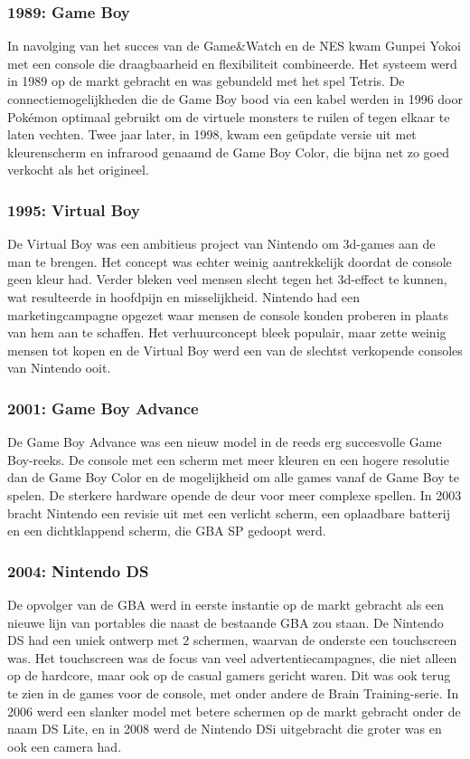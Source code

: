 \documentclass{article}
\begin{document}
\subsubsection{1989: Game Boy}
In navolging van het succes van de Game\&Watch en de NES kwam Gunpei Yokoi met een console die draagbaarheid en flexibiliteit combineerde. Het systeem werd in 1989 op de markt gebracht en was gebundeld met het spel Tetris. De connectiemogelijkheden die de Game Boy bood via een kabel werden in 1996 door Pok\'emon optimaal gebruikt om de virtuele monsters te ruilen of tegen elkaar te laten vechten. Twee jaar later, in 1998, kwam een ge\"update versie uit met kleurenscherm en infrarood genaamd de Game Boy Color, die bijna net zo goed verkocht als het origineel.
\subsubsection{1995: Virtual Boy}
De Virtual Boy was een ambitieus project van Nintendo om 3d-games aan de man te brengen. Het concept was echter weinig aantrekkelijk doordat de console geen kleur had. Verder bleken veel mensen slecht tegen het 3d-effect te kunnen, wat resulteerde in hoofdpijn en misselijkheid. Nintendo had een marketingcampagne opgezet waar mensen de console konden proberen in plaats van hem aan te schaffen. Het verhuurconcept bleek populair, maar zette weinig mensen tot kopen en de Virtual Boy werd een van de slechtst verkopende consoles van Nintendo ooit. 
\subsubsection{2001: Game Boy Advance}
De Game Boy Advance was een nieuw model in de reeds erg succesvolle Game Boy-reeks. De console met een scherm met meer kleuren en een hogere resolutie dan de Game Boy Color en de mogelijkheid om alle games vanaf de Game Boy te spelen. De sterkere hardware opende de deur voor meer complexe spellen. In 2003 bracht Nintendo een revisie uit met een verlicht scherm, een oplaadbare batterij en een dichtklappend scherm, die GBA SP gedoopt werd.
\subsubsection{2004: Nintendo DS}
De opvolger van de GBA werd in eerste instantie op de markt gebracht als een nieuwe lijn van portables die naast de bestaande GBA zou staan. De Nintendo DS had een uniek ontwerp met 2 schermen, waarvan de onderste een touchscreen was. Het touchscreen was de focus van veel advertentiecampagnes, die niet alleen op de hardcore, maar ook op de casual gamers gericht waren. Dit was ook terug te zien in de games voor de console, met onder andere de Brain Training-serie. In 2006 werd een slanker model met betere schermen op de markt gebracht onder de naam DS Lite, en in 2008 werd de Nintendo DSi uitgebracht die groter was en ook een camera had. 
\end{document}

